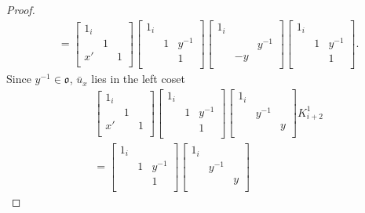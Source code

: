 \documentclass[10pt,a4paper]{amsart}
\newcommand\bu{\bar{u}}
\newcommand\oo{\mathfrak{o}}
\begin{document}
\begin{proof}
\begin{align*}
&= 
\begin{bmatrix}
1_{i} & & \\
 &1 &  \\
x' & &1  \\
\end{bmatrix}
\begin{bmatrix}
1_{i} & & \\
 &1 & y^{-1}  \\
 & &1  \\
\end{bmatrix} 
\begin{bmatrix}
1_{i} & & \\
 & & y^{-1} \\
 & -y & \\
\end{bmatrix}
\begin{bmatrix}
1_{i} & & \\
 &1 & y^{-1}  \\
 & &1  \\
\end{bmatrix}.
\end{align*} 
Since $y^{-1} \in \oo$, $\bu_x$ lies in the left coset
\begin{align*}
& \begin{bmatrix}
1_{i} & & \\
 &1 &  \\
x' & &1  \\
\end{bmatrix}
\begin{bmatrix}
1_{i} & & \\
 &1 & y^{-1}  \\
 & &1  \\
\end{bmatrix} 
\begin{bmatrix}
1_{i} & & \\
 &y^{-1} &  \\
 & &y  \\
\end{bmatrix}K_{i+2}^1 \\
&= 
\begin{bmatrix}
1_{i} & & \\
 &1 & y^{-1}  \\
 & &1  \\
\end{bmatrix}
\begin{bmatrix}
1_{i} & & \\
 &y^{-1} &  \\
 & &y  \\
\end{bmatrix}

\end{align*}
\end{proof}
\end{document}
